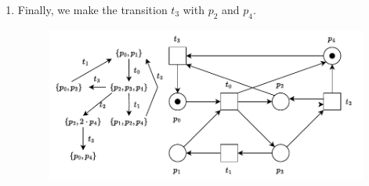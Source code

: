 \begin{enumerate}
\begin{itemize}
\begin{enumerate}
            \item Finally, we make the transition $t_3$ with $p_2$ and $p_4$.
            \begin{figure}[!htp]
                \centering
                \includegraphics[width=\textwidth]{img/reachability-graph-8.pdf}
            \end{figure}
        \end{enumerate}
    \end{itemize}
\end{enumerate}